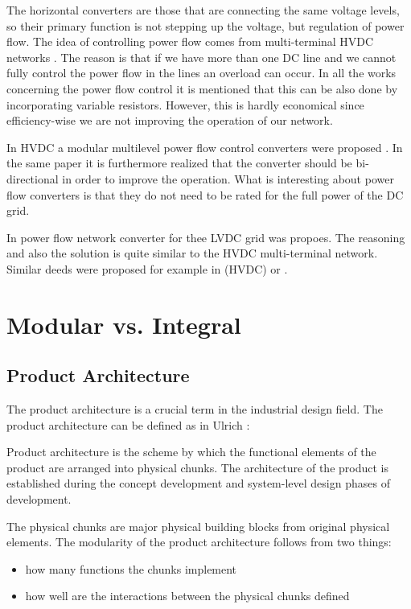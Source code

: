 \documentclass[]{scrartcl}
\newenvironment{definition}[1][Definition]{\begin{trivlist}
		\item[\hskip \labelsep {\bfseries #1}]}{\end{trivlist}}
\begin{document}
The horizontal converters are those that are connecting the same voltage levels, so their primary function is not stepping up the voltage, but regulation of power flow. The idea of controlling power flow comes from multi-terminal HVDC networks \cite{Hajian2012}. The reason is that if we have more than one DC line and we cannot fully control the power flow in the lines an overload can occur. In all the works concerning the power flow control it is mentioned that this can be also done by incorporating variable resistors. However, this is hardly economical since efficiency-wise we are not improving the operation of our network. 

In HVDC a modular multilevel power flow control converters were proposed \cite{Xu2014}. In the same paper it is furthermore realized that the converter should be bi-directional in order to improve the operation. What is interesting about power flow converters is that they do not need to be rated for the full power of the DC grid. 

In \cite{Mackay2015}  power flow network converter for thee LVDC grid was propoes. The reasoning and also the solution is quite similar to the HVDC multi-terminal network. Similar deeds were proposed for example in \cite{Mu2012}(HVDC) or \cite{Mohamed}. 



\newpage
\section{Modular vs. Integral}

\subsection{Product Architecture}
The product architecture is a crucial term in the industrial design field. The product architecture can be defined as in Ulrich \cite{Ulrich2004}:
\begin{definition}
Product architecture is the scheme by which the functional elements of the product are arranged into physical chunks. The architecture of the product is established during the concept development and system-level design phases of development. 
\end{definition}
	
The physical chunks are major physical building blocks from original physical elements. The modularity of the product architecture follows from two things:
\begin{itemize}
	\item how many functions the chunks implement
	\item how well are the interactions between the physical chunks defined
\end{itemize}
		
\end{document}

